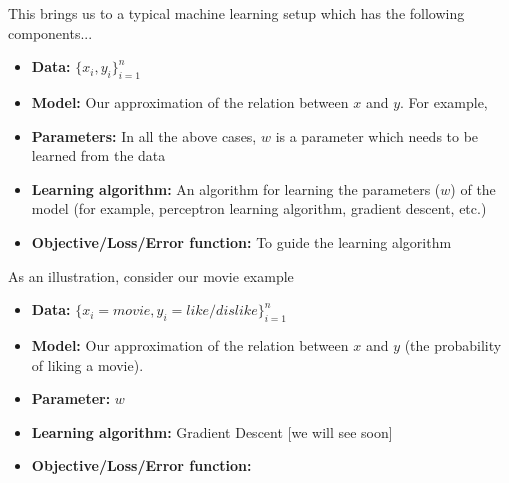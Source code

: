 \documentclass[serif, aspectratio=169]{beamer}
\begin{document}
\begin{frame}
This brings us to a typical machine learning setup which has the following components...

\begin{itemize}\justifying
\item<2-> \textbf{Data:} $\{x_i, y_i\}_{i=1}^{n}$
\item<3-> \textbf{Model:} Our approximation of the relation between $x$ and $y$. For example, 
\item<8-> \textbf{Parameters:} In all the above cases, $w$ is a parameter which needs to be learned from the data
\item<9-> \textbf{Learning algorithm:} An algorithm for learning the parameters ($w$) of the model (for example, perceptron learning algorithm, gradient descent, etc.)
\item<10-> \textbf{Objective/Loss/Error function:} To guide the learning algorithm 
\end{itemize}
\end{frame}

\begin{frame}
As an illustration, consider our movie example

\begin{itemize}\justifying
\item<2-> \textbf{Data:} $\{x_i = movie, y_i = like/dislike\}_{i=1}^{n}$ 
\item<3-> \textbf{Model:} Our approximation of the relation between $x$ and $y$ (the probability of liking a movie). 
\vspace{-0.3in}
\item<5-> \textbf{Parameter:} $w$ 
\item<6-> \textbf{Learning algorithm:} Gradient Descent [we will see soon]
\item<7-> \textbf{Objective/Loss/Error function:} 
\end{itemize}
\end{frame}
\end{document}
